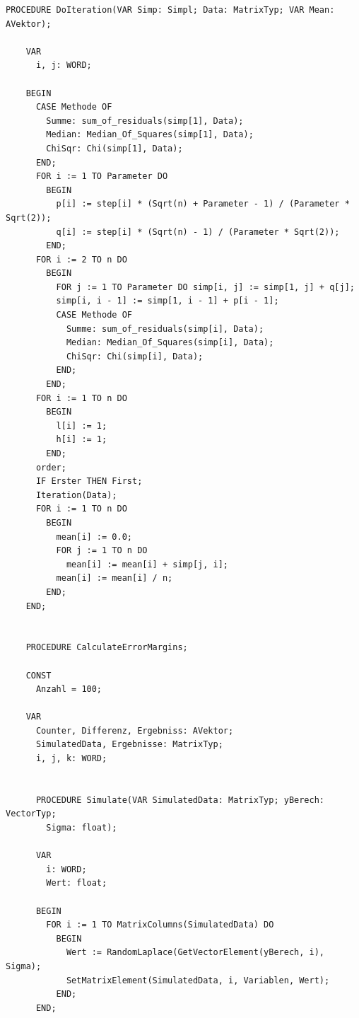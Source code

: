 \begin{refsection}
\begin{lstlisting}[caption=Simplex]
    PROCEDURE DoIteration(VAR Simp: Simpl; Data: MatrixTyp; VAR Mean: AVektor);

    VAR
      i, j: WORD;

    BEGIN
      CASE Methode OF
        Summe: sum_of_residuals(simp[1], Data);
        Median: Median_Of_Squares(simp[1], Data);
        ChiSqr: Chi(simp[1], Data);
      END;
      FOR i := 1 TO Parameter DO
        BEGIN
          p[i] := step[i] * (Sqrt(n) + Parameter - 1) / (Parameter * Sqrt(2));
          q[i] := step[i] * (Sqrt(n) - 1) / (Parameter * Sqrt(2));
        END;
      FOR i := 2 TO n DO
        BEGIN
          FOR j := 1 TO Parameter DO simp[i, j] := simp[1, j] + q[j];
          simp[i, i - 1] := simp[1, i - 1] + p[i - 1];
          CASE Methode OF
            Summe: sum_of_residuals(simp[i], Data);
            Median: Median_Of_Squares(simp[i], Data);
            ChiSqr: Chi(simp[i], Data);
          END;
        END;
      FOR i := 1 TO n DO
        BEGIN
          l[i] := 1;
          h[i] := 1;
        END;
      order;
      IF Erster THEN First;
      Iteration(Data);
      FOR i := 1 TO n DO
        BEGIN
          mean[i] := 0.0;
          FOR j := 1 TO n DO
            mean[i] := mean[i] + simp[j, i];
          mean[i] := mean[i] / n;
        END;
    END;


    PROCEDURE CalculateErrorMargins;

    CONST
      Anzahl = 100;

    VAR
      Counter, Differenz, Ergebniss: AVektor;
      SimulatedData, Ergebnisse: MatrixTyp;
      i, j, k: WORD;


      PROCEDURE Simulate(VAR SimulatedData: MatrixTyp; yBerech: VectorTyp;
        Sigma: float);

      VAR
        i: WORD;
        Wert: float;

      BEGIN
        FOR i := 1 TO MatrixColumns(SimulatedData) DO
          BEGIN
            Wert := RandomLaplace(GetVectorElement(yBerech, i), Sigma);
            SetMatrixElement(SimulatedData, i, Variablen, Wert);
          END;
      END;


\end{lstlisting}
\end{refsection}
